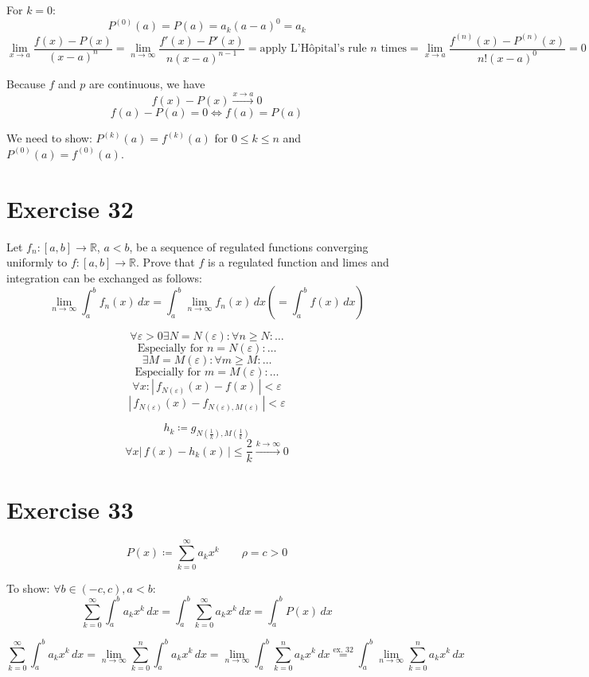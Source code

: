 \documentclass[a4paper]{article}
\theoremstyle{definition}
\newcommand\abs[1]{\left|\,#1\,\right|}
\begin{document}
For $k=0$:
\[ P^{(0)}(a) = P(a) = a_k(a - a)^0 = a_k \]
\[ \lim_{x \to a} \frac{f(x) - P(x)}{(x - a)^n} = \lim_{n\to\infty} \frac{f'(x) - P'(x)}{n (x - a)^{n-1}} = \text{apply L'H\^opital's rule $n$ times} = \lim_{x\to a} \frac{f^{(n)}(x) - P^{(n)}(x)}{n! (x - a)^0} = 0 \]

Because $f$ and $p$ are continuous, we have
\[ f(x) - P(x) \overset{x \to a}{\to} 0 \]
\[ f(a) - P(a) = 0 \Leftrightarrow f(a) = P(a) \]

We need to show: $P^{(k)}(a) = f^{(k)}(a)$ for $0 \leq k \leq n$ and $P^{(0)}(a) = f^{(0)}(a)$.

\section{Exercise 32}
\begin{ex}
  Let $f_n: [a,b] \to \mathbb R$, $a < b$, be a sequence of regulated functions
  converging uniformly to $f: [a,b] \to \mathbb R$. Prove that $f$ is a regulated
  function and limes and integration can be exchanged as follows:
  \[
    \lim_{n\to\infty} \int_a^b f_n(x) \, dx
    = \int_a^b \lim_{n\to\infty} f_n(x)\, dx \left( = \int_a^b f(x) \, dx\right)
  \]
\end{ex}

\[ \forall \varepsilon > 0 \exists N = N(\varepsilon): \forall n \geq N: \ldots \]
\[ \text{Especially for } n = N(\varepsilon): \ldots \]
\[ \exists M = M(\varepsilon): \forall m \geq M: \ldots \]
\[ \text{Especially for } m = M(\varepsilon): \ldots \]
\[ \forall x: \abs{f_{N(\varepsilon)}(x) - f(x)} < \varepsilon \]
\[ \abs{f_{N(\varepsilon)}(x) - f_{N(\varepsilon),M(\varepsilon)}} < \varepsilon \]

\[ h_k \coloneqq g_{N(\frac1{k}),M(\frac{1}{k})} \]
\[ \forall x \abs{f(x) - h_k(x)} \leq \frac{2}{k} \overset{k\to\infty}{\to} 0 \]

\section{Exercise 33}

\[ P(x) \coloneqq \sum_{k=0}^\infty a_k x^k \qquad \rho = c > 0 \]

To show: $\forall b \in (-c,c), a < b$:
\[ \sum_{k=0}^\infty \int_a^b a_k x^k \, dx = \int_a^b \sum_{k=0}^\infty a_k x^k \, dx = \int_a^b P(x) \, dx \]

\[ \sum_{k=0}^\infty \int_a^b a_k x^k \, dx = \lim_{n\to\infty} \sum_{k=0}^n \int_a^b a_k x^k \, dx
= \lim_{n\to\infty} \int_a^b \sum_{k=0}^n a_k x^k \, dx \overset{\text{ex. 32}}{=} \int_a^b \lim_{n\to\infty} \sum_{k=0}^n a_k x^k \, dx \]
\end{document}
